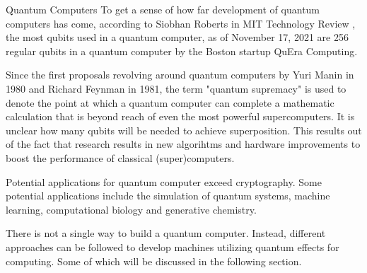 \documentclass[aps,preprintnumbers,twocolumn]{revtex4}
\begin{document}
\begin{section}{Quantum Computers}
To get a sense of how far development of quantum computers has come, 
according to Siobhan Roberts in MIT Technology Review \cite{MIT}, 
the most qubits used in a quantum computer, 
as of November 17, 2021 are 256 regular qubits in a quantum computer by the Boston startup QuEra Computing. 

Since the first proposals revolving around quantum computers by Yuri Manin in 1980 and Richard Feynman in 1981,
the term "quantum supremacy" is used to denote the point at which a quantum computer can complete a mathematic calculation that is beyond reach of even the most powerful supercomputers.
It is unclear how many qubits will be needed to achieve superposition. 
This results out of the fact that research results in new algorihtms and hardware improvements to boost the performance of classical (super)computers. 

Potential applications for quantum computer exceed cryptography. Some potential applications include the simulation of quantum systems, machine learning, computational biology and generative chemistry. 

There is not a single way to build a quantum computer. 
Instead, different approaches can be followed to develop machines utilizing quantum effects for computing. Some of which will be discussed in the following section.

\end{section}
\end{document}
